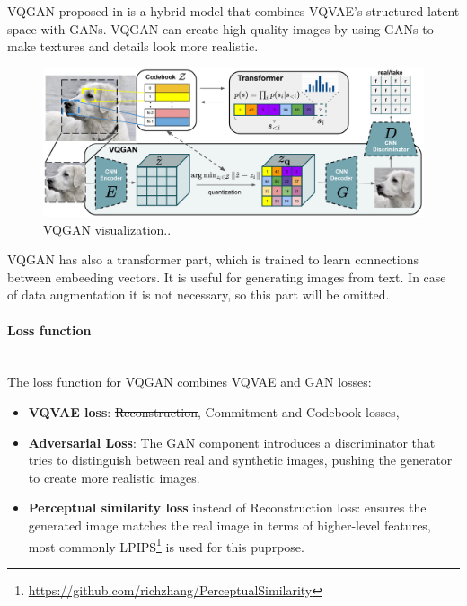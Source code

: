 VQGAN proposed in \cite{Esser_2021_CVPR} is a hybrid model that combines VQVAE's structured latent space with GANs. VQGAN can create high-quality images by using GANs to make textures and details look more realistic.

\begin{figure}[H]
    \centering
    \includegraphics[width=0.9\linewidth]{concept_engineering/vqgan/vqgan.png}
    \caption{VQGAN visualization.\cite{Esser_2021_CVPR}. }
    \label{fig:vqgan-diagram}
\end{figure}

VQGAN has also a transformer part, which is trained to learn connections between embeeding vectors. It is useful for generating images from text. In case of data augmentation it is not necessary, so this part will be omitted.

\paragraph{Loss function}\mbox{}\\

The loss function for VQGAN combines VQVAE and GAN losses:

\begin{itemize}
    \item \textbf{VQVAE loss}: \sout{Reconstruction}, Commitment and Codebook losses,
    \item \textbf{Adversarial Loss}: The GAN component introduces a discriminator that tries to distinguish between real and synthetic images, pushing the generator to create more realistic images.
    \item \textbf{Perceptual similarity loss} instead of Reconstruction loss: ensures the generated image matches the real image in terms of higher-level features, most commonly LPIPS\footnote{\url{https://github.com/richzhang/PerceptualSimilarity}} is used for this puprpose.
\end{itemize}


